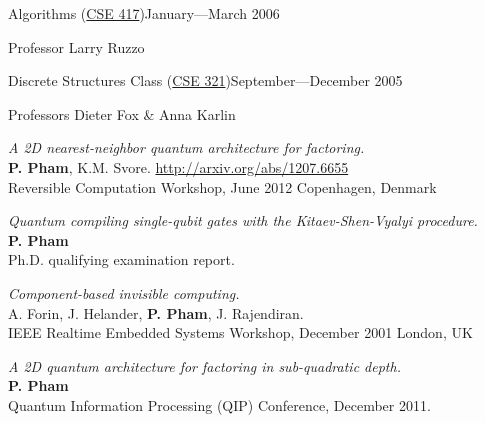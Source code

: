 \documentclass[letter]{article}
\begin{document}
\vspace{0.5\baselineskip}
\par
Algorithms (\href{http://www.cs.washington.edu/education/courses/417/06wi/}{CSE 417})\hfill January---March 2006
\par
Professor Larry Ruzzo

\vspace{0.5\baselineskip}
\par
Discrete Structures Class (\href{http://www.cs.washington.edu/education/courses/321/05au/}{CSE 321})\hfill September---December 2005
\par
Professors Dieter Fox \& Anna Karlin
\par

\pagebreak

\vspace{\baselineskip}
\par
\emph{A 2D nearest-neighbor quantum architecture for factoring.}
\\
\textbf{P. Pham}, K.M. Svore. \hfill \url{http://arxiv.org/abs/1207.6655}\\
Reversible Computation Workshop, June 2012 \hfill Copenhagen, Denmark

\vspace{\baselineskip}
\par
\emph{Quantum compiling single-qubit gates with the Kitaev-Shen-Vyalyi procedure.}\\
\textbf{P. Pham}\\
Ph.D. qualifying examination report.

\vspace{\baselineskip}
\par
\emph{Component-based invisible computing.}\\
A. Forin, J. Helander, \textbf{P. Pham}, J. Rajendiran.\\
IEEE Realtime Embedded Systems Workshop, December 2001 \hfill London, UK

\vspace{\baselineskip}
\par
\emph{A 2D quantum architecture for factoring in sub-quadratic depth.}
\\
\textbf{P. Pham}\\
Quantum Information Processing (QIP) Conference, December 2011.
\end{document}
